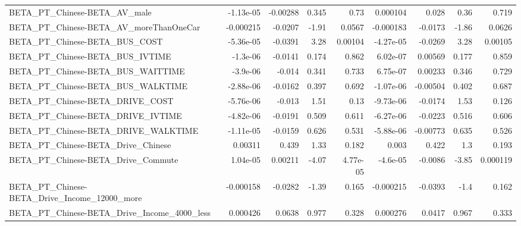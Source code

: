 \begin{tabular}{lrrrrrrrr}
BETA\_PT\_Chinese-BETA\_AV\_male                       &   -1.13e-05 &     -0.00288 &     0.345 &     0.73 &   0.000104 &       0.028 &         0.36 &         0.719 \\
BETA\_PT\_Chinese-BETA\_AV\_moreThanOneCar             &   -0.000215 &      -0.0207 &     -1.91 &   0.0567 &  -0.000183 &     -0.0173 &        -1.86 &        0.0626 \\
BETA\_PT\_Chinese-BETA\_BUS\_COST                      &   -5.36e-05 &      -0.0391 &      3.28 &  0.00104 &  -4.27e-05 &     -0.0269 &         3.28 &       0.00105 \\
BETA\_PT\_Chinese-BETA\_BUS\_IVTIME                    &    -1.3e-06 &      -0.0141 &     0.174 &    0.862 &   6.02e-07 &     0.00569 &        0.177 &         0.859 \\
BETA\_PT\_Chinese-BETA\_BUS\_WAITTIME                  &    -3.9e-06 &       -0.014 &     0.341 &    0.733 &   6.75e-07 &     0.00233 &        0.346 &         0.729 \\
BETA\_PT\_Chinese-BETA\_BUS\_WALKTIME                  &   -2.88e-06 &      -0.0162 &     0.397 &    0.692 &  -1.07e-06 &    -0.00504 &        0.402 &         0.687 \\
BETA\_PT\_Chinese-BETA\_DRIVE\_COST                    &   -5.76e-06 &       -0.013 &      1.51 &     0.13 &  -9.73e-06 &     -0.0174 &         1.53 &         0.126 \\
BETA\_PT\_Chinese-BETA\_DRIVE\_IVTIME                  &   -4.82e-06 &      -0.0191 &     0.509 &    0.611 &  -6.27e-06 &     -0.0223 &        0.516 &         0.606 \\
BETA\_PT\_Chinese-BETA\_DRIVE\_WALKTIME                &   -1.11e-05 &      -0.0159 &     0.626 &    0.531 &  -5.88e-06 &    -0.00773 &        0.635 &         0.526 \\
BETA\_PT\_Chinese-BETA\_Drive\_Chinese                 &     0.00311 &        0.439 &      1.33 &    0.182 &      0.003 &       0.422 &          1.3 &         0.193 \\
BETA\_PT\_Chinese-BETA\_Drive\_Commute                 &    1.04e-05 &      0.00211 &     -4.07 & 4.77e-05 &   -4.6e-05 &     -0.0086 &        -3.85 &      0.000119 \\
BETA\_PT\_Chinese-BETA\_Drive\_Income\_12000\_more       &   -0.000158 &      -0.0282 &     -1.39 &    0.165 &  -0.000215 &     -0.0393 &         -1.4 &         0.162 \\
BETA\_PT\_Chinese-BETA\_Drive\_Income\_4000\_less        &    0.000426 &       0.0638 &     0.977 &    0.328 &   0.000276 &      0.0417 &        0.967 &         0.333 \\

\end{tabular}

